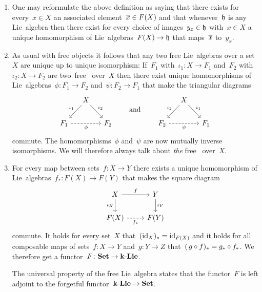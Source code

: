 \begin{remark}
  \leavevmode
  \begin{enumerate}
    \item
      One may reformulate the above definition as saying that there exists for every~$x \in X$ an associated element~$\overline{x} \in F(X)$ and that whenever~$\mathfrak{h}$ is any Lie~algebra then there exist for every choice of images~$y_x \in \mathfrak{h}$ with~$x \in X$ a unique homomorphism of Lie~algebras~$F(X) \to \mathfrak{h}$ that maps~$\overline{x}$ to~$y_x$.
    \item
      As usual with free objects it follows that any two free Lie~algebras over a set~$X$ are unique up to unique isomorphism:
      If~$F_1$ with~$\iota_1 \colon X \to F_1$ and~$F_2$ with~$\iota_2 \colon X \to F_2$ are two~free~{\liealgebras{$\kf$}} over~$X$ then there exist unique homomorphisms of Lie~algebras~$\phi \colon F_1 \to F_2$ and~$\psi \colon F_2 \to F_1$ that make the triangular diagrams
      \[
        \begin{tikzcd}[column sep = small]
          {}
          &
          X
          \arrow{dl}[above left]{\iota_1}
          \arrow{dr}[above right]{\iota_2}
          &
          {}
          \\
          F_1
          \arrow[dashed]{rr}[below]{\phi}
          &
          {}
          &
          F_2
        \end{tikzcd}
        \qquad\text{and}\qquad
        \begin{tikzcd}[column sep = small]
          {}
          &
          X
          \arrow{dl}[above left]{\iota_2}
          \arrow{dr}[above right]{\iota_1}
          &
          {}
          \\
          F_2
          \arrow[dashed]{rr}[below]{\psi}
          &
          {}
          &
          F_1
        \end{tikzcd}
      \]
      commute.
      The homomorphisms~$\phi$ and~$\psi$ are now mutually inverse isomorphisms.
      We will therefore always talk about \emph{the} free~{\liealgebra{$\kf$}} over~$X$.
    \item
      For every map between sets~$f \colon X \to Y$ there exists a unique homomorphism of Lie~algebras~$f_* \colon F(X) \to F(Y)$ that makes the square diagram
      \[
        \begin{tikzcd}
          X
          \arrow{r}[above]{f}
          \arrow{d}[left]{\iota_X}
          &
          Y
          \arrow{d}[right]{\iota_Y}
          \\
          F(X)
          \arrow[dashed]{r}[below]{f_*}
          &
          F(Y)
        \end{tikzcd}
      \]
      commute.
      It holds for every set~$X$ that~$(\operatorname{id}_X)_* = \operatorname{id}_{F(X)}$ and it holds for all composable maps of sets~$f \colon X \to Y$ and~$g \colon Y \to Z$ that~$(\, g \circ f)_* = g_* \circ f_*$.
      We therefore get a functor~$F \colon \mathbf{Set} \to \mathbf{k}\text{-}\mathbf{Lie}$.
      
      The universal property of the free Lie~algebra states that the functor~$F$ is left adjoint to the forgetful functor~$\mathbf{k}\text{-}\mathbf{Lie} \to \mathbf{Set}$.
  \end{enumerate}
\end{remark}


